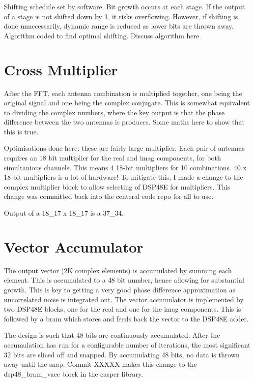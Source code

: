 Shifting schedule set by software. Bit growth occurs at each stage. If the output of a stage is not shifted down by 1, it risks overflowing. However, if shifting is done unnecessarily, dynamic range is reduced as lower bits are thrown away. Algorithm coded to find optimal shifting. Discuss algorithm here.

\section{Cross Multiplier}
After the FFT, each antenna combination is multiplied together, one being the original signal and one being the complex conjugate. This is somewhat equivalent to dividing the complex numbers, where the key output is that the phase difference between the two antennas is produces. Some maths here to show that this is true. 

Optimisations done here: these are fairly large multiplier. Each pair of antennas requires an 18 bit multiplier for the real and imag components, for both simultanious channels. This means 4 18-bit multipliers for 10 combinations. 40 x 18-bit multipliers is a lot of hardware! 
To mitigate this, I made a change to the complex multiplier block to allow selecting of DSP48E for multipliers. This change was committed back into the centeral code repo for all to use.

Output of a 18\_17 x 18\_17 is a 37\_34. 

\section{Vector Accumulator}
The output vector (2K complex elements) is accumulated by summing each element. 
This is accumulated to a 48 bit number, hence allowing for substantial growth. 
This is key to getting a very good phase difference approximation as uncorrelated noise is integrated out. 
The vector accumulator is implemented by two DSP48E blocks, one for the real and one for the imag components. 
This is followed by a bram which stores and feeds back the vector to the DSP48E adder. 

The design is such that 48 bits are continuously accumulated. After the accumulation has run for a configurable number of iterations, the most significant 32 bits are sliced off and snapped. By accumulating 48 bits, no data is thrown away until the snap. Commit XXXXX makes this change to the dsp48\_bram\_vacc block in the casper library.

